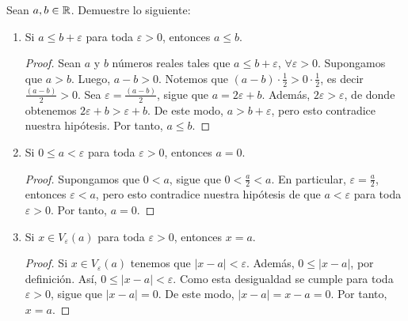 Sean $a,b \in \mathbb{R}$. Demuestre lo siguiente:

\begin{enumerate}[label=\alph*)]
  \item Si $a \leq b + \varepsilon$ para toda $\varepsilon > 0$, entonces $a \leq b$.
 
  \begin{proof} 
   Sean $a$ y $b$ números reales tales que $a \leq b + \varepsilon$, $\forall \varepsilon > 0$. Supongamos que $a > b$. Luego, $a-b>0$. Notemos que $(a-b) \cdot \frac{1}{2} > 0 \cdot \frac{1}{2}$, es decir $\frac{(a-b)}{2} > 0$. Sea $\varepsilon = \frac{(a-b)}{2}$, sigue que $a=2\varepsilon+b$. Además, $2\varepsilon > \varepsilon$, de donde obtenemos $2 \varepsilon + b > \varepsilon + b$. De este modo, $a > b+\varepsilon$, pero esto contradice nuestra hipótesis. Por tanto, $a \leq b$. 
  \end{proof}
  
 \item Si $0 \leq a < \varepsilon$ para toda $\varepsilon > 0$, entonces $a=0$.
 
 \begin{proof} 
  Supongamos que $0<a$, sigue que $0<\frac{a}{2}<a$. En particular, $\varepsilon=\frac{a}{2}$, entonces $\varepsilon<a$, pero esto contradice nuestra hipótesis de que $a< \varepsilon$ para toda $\varepsilon>0$. Por tanto, $a=0$. 
 \end{proof}

 \item Si $x\in V_\varepsilon(a)$ para toda $\varepsilon>0$, entonces $x=a$.
 \begin{proof} 
  Si $x\in V_\varepsilon(a)$ tenemos que $|x-a|<\varepsilon$. Además, $0\leq |x-a|$, por definición. Así, $0\leq |x-a|<\varepsilon$. Como esta desigualdad se cumple para toda $\varepsilon>0$, sigue que $|x-a|=0$. De este modo, $|x-a|=x-a=0$. Por tanto, $x=a$. 
 \end{proof}
 
\clearpage\pagebreak


\end{enumerate}
